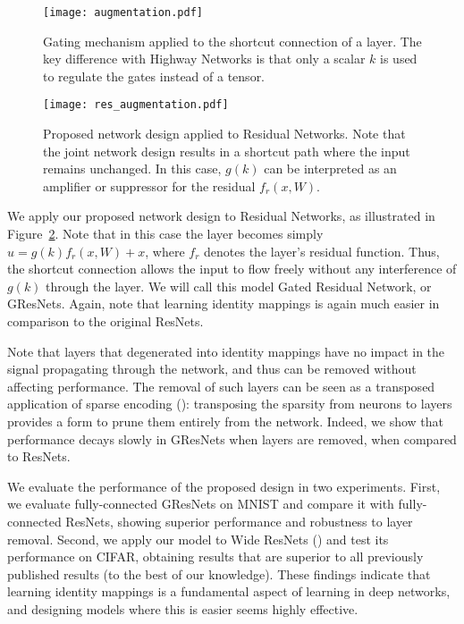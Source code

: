 \documentclass{article} %
\begin{document}
\begin{figure}[!ht]
  \centering
    \texttt{[image: augmentation.pdf]}
  \caption{Gating mechanism applied to the shortcut connection of a layer. The key difference with Highway Networks is that only a scalar $k$ is used to regulate the gates instead of a tensor.}
\label{aug}
\end{figure}

\begin{figure}[!ht]
  \centering
    \texttt{[image: res\_augmentation.pdf]}
  \caption{Proposed network design applied to Residual Networks. Note that the joint network design results in a shortcut path where the input remains unchanged. In this case, $g(k)$ can be interpreted as an amplifier or suppressor for the residual $f_r(x,W)$.}
\label{resaug}
\end{figure}





We apply our proposed network design to Residual Networks, as illustrated in Figure~\ref{resaug}. Note that in this case the layer becomes simply $u = g(k) f_r(x,W) + x$, where $f_r$ denotes the layer's residual function. Thus, the shortcut connection allows the input to flow freely without any interference of $g(k)$ through the layer. We will call this model Gated Residual Network, or GResNets. Again, note that learning identity mappings is again much easier in comparison to the original ResNets. 




Note that layers that degenerated into identity mappings have no impact in the signal propagating through the network, and thus can be removed without affecting performance. The removal of such layers can be seen as a transposed application of sparse encoding (\cite{sparse}): transposing the sparsity from neurons to layers provides a form to prune them entirely from the network. Indeed, we show that performance decays slowly in GResNets when layers are removed, when compared to ResNets.



We evaluate the performance of the proposed design in two experiments. First, we evaluate fully-connected GResNets on MNIST and compare it with fully-connected ResNets, showing superior performance and robustness to layer removal. Second, we apply our model to Wide ResNets (\cite{wide}) and test its performance on CIFAR, obtaining results that are superior to all previously published results (to the best of our knowledge). These findings indicate that learning identity mappings is a fundamental aspect of learning in deep networks, and designing models where this is easier seems highly effective.
\end{document}
